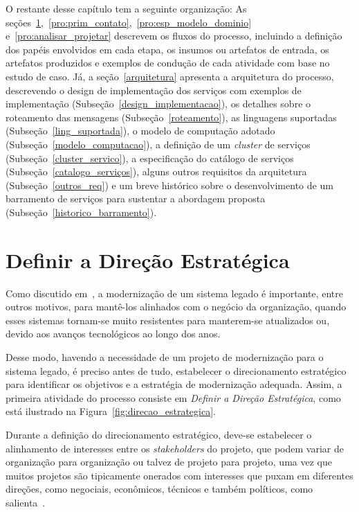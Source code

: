 O restante desse capítulo tem a seguinte organização: 
As seções~\ref{pro:direcao},~\ref{pro:prim_contato},~\ref{pro:esp_modelo_dominio} 
e~\ref{pro:analisar_projetar}
descrevem os fluxos do processo,
incluindo a definição dos papéis envolvidos em cada etapa, 
os insumos ou artefatos de entrada, 
os artefatos produzidos e exemplos de condução de cada 
atividade com base no estudo de caso. 
Já, a seção~\ref{arquitetura}
apresenta a arquitetura do processo, 
descrevendo o design de implementação dos serviços
com exemplos de implementação (Subseção~\ref{design_implementacao}), 
os detalhes sobre o roteamento das 
mensagens (Subseção~\ref{roteamento}), as 
linguagens suportadas (Subseção~\ref{ling_suportada}), 
o modelo de computação adotado (Subseção~\ref{modelo_computacao}), 
a definição de um \textit{cluster} de serviços (Subseção~\ref{cluster_servico}), 
a especificação do catálogo de serviços (Subseção~\ref{catalogo_serviços}), 
alguns outros requisitos da arquitetura (Subseção~\ref{outros_req}) e 
um breve histórico sobre o desenvolvimento 
de um barramento de serviços para sustentar a abordagem proposta (Subseção~\ref{historico_barramento}).


\section{Definir a Direção Estratégica}\label{pro:direcao}


Como discutido em~\cite{S3_Bisbal:1999, 
Salvatierra:2013, WeidermanApproachesto:1997}, 
a modernização de um sistema legado é importante,
entre outros motivos,
para mantê-los alinhados 
com o negócio da organização, 
quando esses sistemas tornam-se
muito resistentes para manterem-se atualizados ou,
devido aos avanços tecnológicos ao longo dos anos.

Desse modo, havendo a necessidade de 
um projeto de modernização para o sistema legado,
é preciso antes de tudo,
estabelecer o direcionamento estratégico 
para identificar os objetivos e
a estratégia de modernização adequada.
Assim, a primeira atividade do processo
consiste em \emph{Definir a Direção Estratégica}, 
como está ilustrado na Figura~\ref{fig:direcao_estrategica}.

Durante a definição do direcionamento estratégico,
deve-se estabelecer o alinhamento de interesses 
entre os \textit{stakeholders} do projeto, 
que podem variar de organização 
para organização ou
talvez de projeto para projeto, uma vez que
muitos projetos são 
tipicamente onerados com interesses que puxam em diferentes direções, 
como negociais, econômicos, técnicos e também políticos,
como salienta~\cite{OORP2013}.

